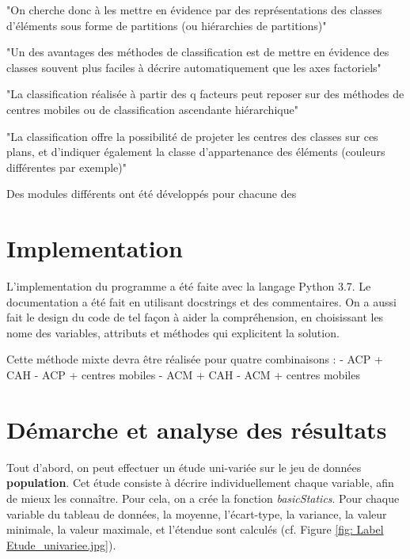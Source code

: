 \documentclass{rapportECL}
\begin{document}
"On cherche donc à les mettre en évidence
par des représentations des classes
d’éléments sous forme de partitions (ou
hiérarchies de partitions)" %

"Un des avantages des méthodes de
classification est de mettre en évidence des
classes souvent plus faciles à décrire
automatiquement que les axes factoriels" %

"La classification réalisée à partir des q facteurs
peut reposer sur des méthodes de centres
mobiles ou de classification ascendante
hiérarchique" %

"La classification offre la possibilité de projeter les centres des 
classes sur ces plans, et d’indiquer également la classe
d’appartenance des éléments (couleurs différentes par exemple)"%


Des modules différents ont été développés pour chacune des 

\section{Implementation}

L'implementation du programme a été faite avec la langage Python 3.7. Le documentation a été fait en utilisant docstrings et des commentaires. On a aussi fait le design du code de tel façon  à aider la compréhension, en choisissant les nome des variables, attributs et méthodes qui explicitent la solution. 

Cette méthode mixte devra être réalisée pour quatre combinaisons :
- ACP + CAH
- ACP + centres mobiles
- ACM + CAH
- ACM + centres mobiles

\section{Démarche et analyse des résultats}

Tout d'abord, on peut effectuer un étude uni-variée sur le jeu de données \textbf{population}. Cet étude consiste à décrire individuellement chaque variable, afin de mieux les connaître. Pour cela, on a crée la fonction \textit{basicStatics}. Pour chaque variable du tableau de données, la moyenne, l'écart-type, la variance, la valeur minimale, la valeur maximale, et l'étendue sont calculés (cf. Figure \ref{fig: Label Etude_univariee.jpg}).

\end{document}

